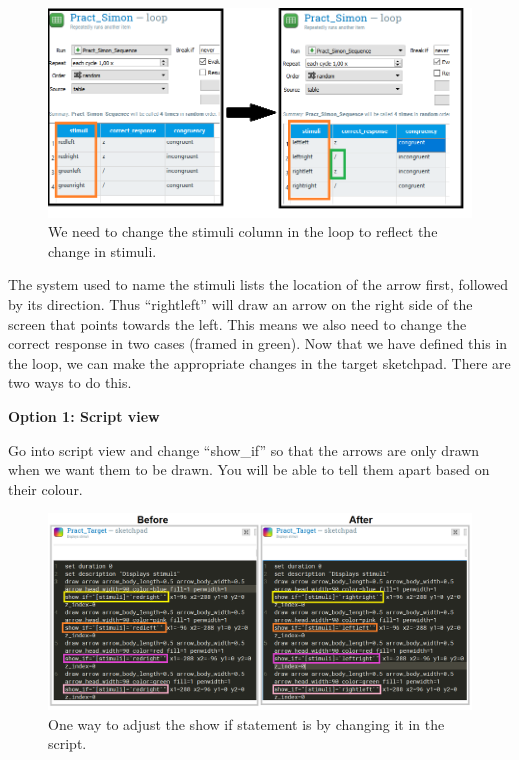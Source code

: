 \documentclass[
]{book}
\begin{document}
\begin{figure}

{\centering \includegraphics[width=0.99\linewidth]{images/changesimon/06Loop} 

}

\caption{We need to change the stimuli column in the loop to reflect the change in stimuli.}\label{fig:Figure2-12}
\end{figure}

The system used to name the stimuli lists the location of the arrow first, followed by its direction. Thus ``rightleft'' will draw an arrow on the right side of the screen that points towards the left. This means we also need to change the correct response in two cases (framed in green). Now that we have defined this in the loop, we can make the appropriate changes in the target sketchpad. There are two ways to do this.

\textbf{Option 1: Script view}

Go into script view and change ``show\_if'' so that the arrows are only drawn when we want them to be drawn. You will be able to tell them apart based on their colour.

\begin{figure}

{\centering \includegraphics[width=0.99\linewidth]{images/changesimon/07script} 

}

\caption{One way to adjust the show if statement is by changing it in the script.}\label{fig:Figure2-13}
\end{figure}
\end{document}
